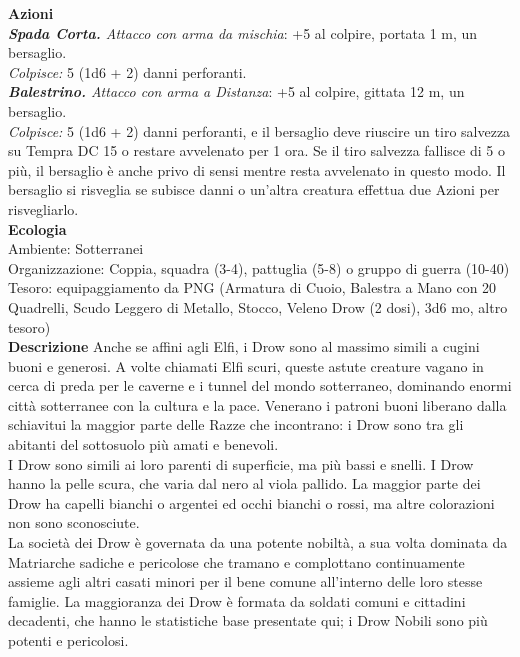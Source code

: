 \begin{multicols}{2}
\smallskip\textbf{Azioni}\\
\emph{\textbf{Spada Corta.} Attacco con arma da mischia}: +5 al colpire, portata 1 m, un bersaglio.\\
\emph{Colpisce:} 5 (1d6 + 2) danni perforanti.\\
\emph{\textbf{Balestrino.} Attacco con arma a Distanza}: +5 al colpire, gittata 12 m, un bersaglio.\\
\emph{Colpisce:} 5 (1d6 + 2) danni perforanti, e il bersaglio deve riuscire un tiro salvezza su Tempra DC  15 o restare avvelenato per 1 ora. Se il tiro salvezza fallisce di 5 o più, il bersaglio è anche privo di sensi mentre resta avvelenato in questo modo. Il bersaglio si risveglia se subisce danni o un'altra creatura effettua due Azioni per risvegliarlo.\\
\textbf{Ecologia}\\
Ambiente: Sotterranei\\
Organizzazione: Coppia, squadra (3-4), pattuglia (5-8) o gruppo di guerra (10-40)\\
Tesoro: equipaggiamento da PNG (Armatura di Cuoio, Balestra a Mano con 20 Quadrelli, Scudo Leggero di Metallo, Stocco, Veleno Drow (2 dosi), 3d6 mo, altro tesoro)\\
\textbf{Descrizione}
Anche se affini agli Elfi, i Drow sono al massimo simili a cugini buoni e generosi. A volte chiamati Elfi scuri, queste astute creature vagano in cerca di preda per le caverne e i tunnel del mondo sotterraneo, dominando enormi città sotterranee con la cultura e la pace. Venerano i patroni buoni liberano dalla schiavitui la maggior parte delle Razze che incontrano: i Drow sono tra gli abitanti del sottosuolo più amati e benevoli.\\

I Drow sono simili ai loro parenti di superficie, ma più bassi e snelli. I Drow hanno la pelle scura, che varia dal nero al viola pallido. La maggior parte dei Drow ha capelli bianchi o argentei ed occhi bianchi o rossi, ma altre colorazioni non sono sconosciute.\\

La società dei Drow è governata da una potente nobiltà, a sua volta dominata da Matriarche sadiche e pericolose che tramano e complottano continuamente assieme agli altri casati minori per il bene comune all’interno delle loro stesse famiglie. La maggioranza dei Drow è formata da soldati comuni e cittadini decadenti, che hanno le statistiche base presentate qui; i Drow Nobili sono più potenti e pericolosi.\\


\end{multicols}

